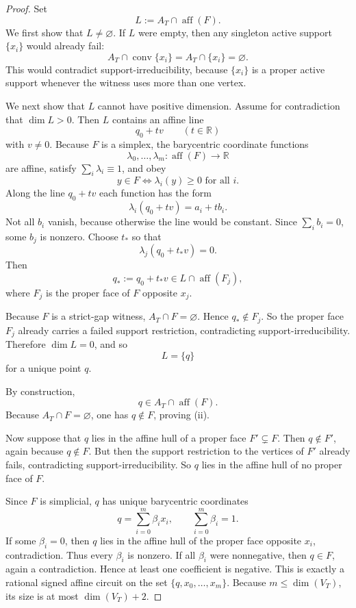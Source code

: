 \documentclass[11pt]{article}
\theoremstyle{definition}
\newcommand{\R}{\mathbb{R}}
\newcommand{\1}{\mathbf{1}}
\begin{document}
\begin{proof}
Set
\[
L:=A_T\cap \operatorname{aff}(F).
\]
We first show that $L\neq \varnothing$.
If $L$ were empty, then any singleton active support $\{x_i\}$ would already fail:
\[
A_T\cap \operatorname{conv}\{x_i\}=A_T\cap \{x_i\}=\varnothing.
\]
This would contradict support-irreducibility, because $\{x_i\}$ is a proper active support whenever the witness uses more than one vertex.

We next show that $L$ cannot have positive dimension.
Assume for contradiction that $\dim L>0$.
Then $L$ contains an affine line
\[
q_0+t v
\qquad (t\in \R)
\]
with $v\neq 0$.
Because $F$ is a simplex, the barycentric coordinate functions
\[
\lambda_0,\dots,\lambda_m:\operatorname{aff}(F)\to \R
\]
are affine, satisfy $\sum_i \lambda_i\equiv 1$, and obey
\[
y\in F \iff \lambda_i(y)\ge 0 \text{ for all }i.
\]
Along the line $q_0+t v$ each function has the form
\[
\lambda_i(q_0+t v)=a_i+t b_i.
\]
Not all $b_i$ vanish, because otherwise the line would be constant.
Since $\sum_i b_i=0$, some $b_j$ is nonzero.
Choose $t_*$ so that
\[
\lambda_j(q_0+t_*v)=0.
\]
Then
\[
q_*:=q_0+t_*v\in L\cap \operatorname{aff}(F_j),
\]
where $F_j$ is the proper face of $F$ opposite $x_j$.

Because $F$ is a strict-gap witness, $A_T\cap F=\varnothing$.
Hence $q_*\notin F_j$.
So the proper face $F_j$ already carries a failed support restriction, contradicting support-irreducibility.
Therefore $\dim L=0$, and so
\[
L=\{q\}
\]
for a unique point $q$.

By construction,
\[
q\in A_T\cap \operatorname{aff}(F).
\]
Because $A_T\cap F=\varnothing$, one has $q\notin F$, proving (ii).

Now suppose that $q$ lies in the affine hull of a proper face $F'\subsetneq F$.
Then $q\notin F'$, again because $q\notin F$.
But then the support restriction to the vertices of $F'$ already fails, contradicting support-irreducibility.
So $q$ lies in the affine hull of no proper face of $F$.

Since $F$ is simplicial, $q$ has unique barycentric coordinates
\[
q=\sum_{i=0}^m \beta_i x_i,
\qquad
\sum_{i=0}^m \beta_i=1.
\]
If some $\beta_i=0$, then $q$ lies in the affine hull of the proper face opposite $x_i$, contradiction.
Thus every $\beta_i$ is nonzero.
If all $\beta_i$ were nonnegative, then $q\in F$, again a contradiction.
Hence at least one coefficient is negative.
This is exactly a rational signed affine circuit on the set $\{q,x_0,\dots,x_m\}$.
Because $m\le \dim(V_T)$, its size is at most $\dim(V_T)+2$.
\end{proof}
\end{document}
